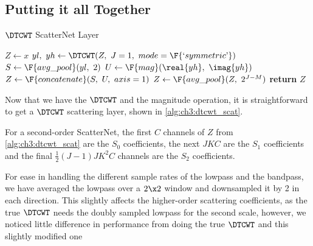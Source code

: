 \subsection{Putting it all Together}\label{sec:ch3:combining}

\begin{algorithm}[tb]
  \caption{$\DTCWT$ ScatterNet Layer}
  \label{alg:ch3:dtcwt_scat}
\begin{algorithmic}[1]
\State $Z \gets x$
  \State $yl,\ yh \gets \DTCWT(Z,\ J=1,\ mode=\F{`symmetric \textrm'})$
  \State $S \gets \F{avg\_pool}(yl,\ 2)$
  \State $U \gets \F{mag}(\real{yh},\ \imag{yh})$
  \State $Z \gets \F{concatenate}(S,\ U,\ axis=1)$ 
\EndFor
{}
\State $Z \gets \F{avg\_pool}(Z,\ 2^{J-M})$
\EndIf
\State \textbf{return} $Z$
\EndFunction
\end{algorithmic}
\end{algorithm}
Now that we have the $\DTCWT$ and the magnitude operation, it is straightforward
to get a $\DTCWT$ scattering layer, shown in \autoref{alg:ch3:dtcwt_scat}.

For a second-order ScatterNet, the first $C$ channels of $Z$ from
\autoref{alg:ch3:dtcwt_scat} are the $S_0$ coefficients, the next $JKC$ are the
$S_1$ coefficients and the final $\frac{1}{2}(J-1)JK^2C$ channels are the
$S_2$ coefficients.

For ease in handling the different sample rates of the lowpass and the
bandpass, we have averaged the lowpass over a $2\x 2$ window and downsampled it
by 2 in each direction. This slightly
affects the higher-order scattering coefficients, as the true $\DTCWT$ needs the doubly
sampled lowpass for the second scale, however, we noticed little difference in
performance from doing the true $\DTCWT$ and this slightly modified one

